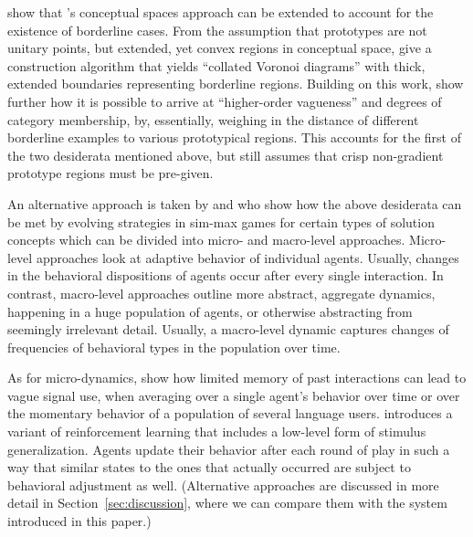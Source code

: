 \citet{DouvenDecock2011:Vagueness:-A-Co} show that
\citeauthor{Gardenfors2000:Conceptual-Spac}'s conceptual spaces
approach can be extended to account for the existence of borderline
cases. From the assumption that prototypes are not unitary points, but
extended, yet convex regions in conceptual space,
\citeauthor{DouvenDecock2011:Vagueness:-A-Co} give a construction
algorithm that yields ``collated Voronoi diagrams'' with thick,
extended boundaries representing borderline regions. Building on this
work, \citet{DecockDouven2012:What-is-Graded-} show further how it is
possible to arrive at ``higher-order vagueness'' and degrees of
category membership, by, essentially, weighing in the distance of
different borderline examples to various prototypical regions. This
accounts for the first of the two desiderata mentioned above, but
still assumes that crisp non-gradient prototype regions must be
pre-given.

An alternative approach is taken by
\citet{FrankeJager2010:Vagueness-Signa} and
\citet{OConnor2013:The-Evolution-o} who show how the above desiderata
can be met by evolving strategies in sim-max games for certain types
of solution concepts which can be divided into micro- and macro-level
approaches. Micro-level approaches look at adaptive behavior of
individual agents. Usually, changes in the behavioral dispositions of
agents occur after every single interaction. In contrast, macro-level
approaches outline more abstract, aggregate dynamics, happening in a
huge population of agents, or otherwise abstracting from seemingly
irrelevant detail. Usually, a macro-level dynamic captures changes of
frequencies of behavioral types in the population over time.

As for micro-dynamics, \citet{FrankeJager2010:Vagueness-Signa} show
how limited memory of past interactions can lead to vague signal use,
when averaging over a single agent's behavior over time or over the
momentary behavior of a population of several language
users. \citet{OConnor2013:The-Evolution-o} introduces a variant of
reinforcement learning that includes a low-level form of stimulus
generalization. Agents update their behavior after each round of play
in such a way that similar states to the ones that actually occurred
are subject to behavioral adjustment as well. (Alternative approaches
are discussed in more detail in Section~\ref{sec:discussion}, where we
can compare them with the system introduced in this paper.)

